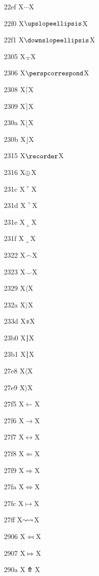 \documentclass[11pt]{article}
\begin{document}
22ef X{\ensuremath{\cdots}}X

22f0 X{\ensuremath{\upslopeellipsis}}X

22f1 X{\ensuremath{\downslopeellipsis}}X

2305 X{\ensuremath{\barwedge}}X

2306 X{\ensuremath{\perspcorrespond}}X

2308 X{\ensuremath{\lceil}}X

2309 X{\ensuremath{\rceil}}X

230a X{\ensuremath{\lfloor}}X

230b X{\ensuremath{\rfloor}}X

2315 X{\ensuremath{\recorder}}X

2316 X{\ensuremath{\mathchar"2208}}X

231c X{\ensuremath{\ulcorner}}X

231d X{\ensuremath{\urcorner}}X

231e X{\ensuremath{\llcorner}}X

231f X{\ensuremath{\lrcorner}}X

2322 X{\ensuremath{\frown}}X

2323 X{\ensuremath{\smile}}X

2329 X{\ensuremath{\langle}}X

232a X{\ensuremath{\rangle}}X

233d X{\ensuremath{\obar}}X

23b0 X{\ensuremath{\lmoustache}}X

23b1 X{\ensuremath{\rmoustache}}X

27e8 X{\ensuremath{\langle}}X

27e9 X{\ensuremath{\rangle}}X

27f5 X{\ensuremath{\longleftarrow}}X

27f6 X{\ensuremath{\longrightarrow}}X

27f7 X{\ensuremath{\longleftrightarrow}}X

27f8 X{\ensuremath{\Longleftarrow}}X

27f9 X{\ensuremath{\Longrightarrow}}X

27fa X{\ensuremath{\Longleftrightarrow}}X

27fc X{\ensuremath{\longmapsto}}X

27ff X{\ensuremath{\sim\joinrel\leadsto}}X

2906 X{\ensuremath{\Mapsfrom}}X

2907 X{\ensuremath{\Mapsto}}X

290a X{\ensuremath{\Uuparrow}}X
\end{document}

